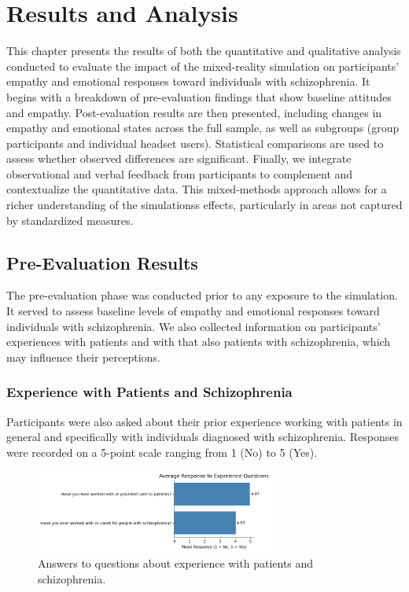 \chapter{Results and Analysis}
\label{ch:resultsandanalysis}

This chapter presents the results of both the quantitative and qualitative analysis conducted to evaluate the impact of the mixed-reality simulation on participants’ empathy and emotional responses toward individuals with schizophrenia. It begins with a breakdown of pre-evaluation findings that show baseline attitudes and empathy. Post-evaluation results are then presented, including changes in empathy and emotional states across the full sample, as well as subgroups (group participants and individual headset users). Statistical comparisons are used to assess whether observed differences are significant. Finally, we integrate observational and verbal feedback from participants to complement and contextualize the quantitative data. This mixed-methods approach allows for a richer understanding of the simulationss effects, particularly in areas not captured by standardized measures.

\section{Pre-Evaluation Results}
The pre-evaluation phase was conducted prior to any exposure to the simulation. It served to assess baseline levels of empathy and emotional responses toward individuals with schizophrenia. We also collected information on participants' experiences with patients and with that also patients with schizophrenia, which may influence their perceptions.

\subsection{Experience with Patients and Schizophrenia}

Participants were also asked about their prior experience working with patients in general and specifically with individuals diagnosed with schizophrenia. Responses were recorded on a 5-point scale ranging from 1 (No) to 5 (Yes).


\begin{figure}[H]
    \centering
    \includegraphics[width=0.7\textwidth]{../../Figures/experience-patients.png}
    \caption{Answers to questions about experience with patients and schizophrenia.}
    \label{fig:experience_patients}
\end{figure}

